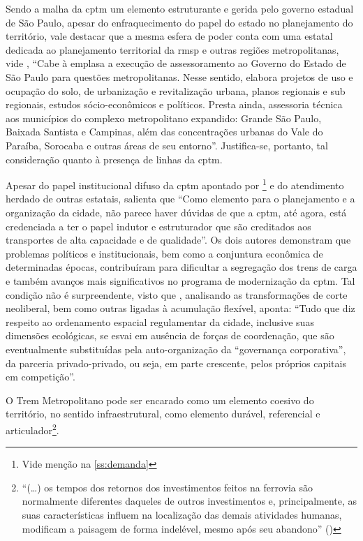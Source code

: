 \documentclass[11pt,fleqn]{book} %
\begin{document}
Sendo a malha da \gls{cptm} um elemento estruturante e gerida pelo governo estadual de São Paulo, apesar do enfraquecimento do papel do estado no planejamento do território, vale destacar que a mesma esfera de poder conta com uma estatal dedicada ao planejamento territorial da \gls{rmsp} e outras regiões metropolitanas, vide \cite[p. 224]{Stefani}, ``Cabe à \gls{emplasa} a execução de assessoramento ao Governo do Estado de São Paulo para questões metropolitanas. Nesse sentido, elabora projetos de uso e ocupação do solo, de urbanização e revitalização urbana, planos regionais e sub regionais, estudos sócio-econômicos e políticos. Presta ainda, assessoria técnica aos municípios do complexo metropolitano expandido: Grande São Paulo, Baixada Santista e Campinas, além das concentrações urbanas do Vale do Paraíba, Sorocaba e outras áreas de seu entorno''. Justifica-se, portanto, tal consideração quanto à presença de linhas da \gls{cptm}.

Apesar do papel institucional difuso da \gls{cptm} apontado por \cite{Isoda}\footnote{Vide menção na \autoref{ss:demanda}} e do atendimento herdado de outras estatais, \cite[p. 97]{Ferreira} salienta que ``Como elemento para o planejamento e a organização da cidade, não parece haver dúvidas de que a \gls{cptm}, até agora, está credenciada a ter o papel indutor e estruturador que são creditados aos transportes de alta capacidade e de qualidade''. Os dois autores demonstram que problemas políticos e institucionais, bem como a conjuntura econômica de determinadas épocas, contribuíram para dificultar a segregação dos trens de carga e também avanços mais significativos no programa de modernização da \gls{cptm}. Tal condição não é surpreendente, visto que \cite[p. 31]{Acselrad}, analisando as transformações de corte neoliberal, bem como outras ligadas à acumulação flexível, aponta: ``Tudo que diz respeito ao ordenamento	espacial regulamentar da cidade, inclusive suas dimensões ecológicas, se esvai em ausência	de forças de coordenação, que são eventualmente substituídas pela auto-organização da “governança corporativa”, da parceria privado-privado, ou seja, em parte crescente, pelos próprios capitais em competição''.

O Trem Metropolitano pode ser encarado como um elemento coesivo do território, no sentido infraestrutural, como elemento durável, referencial e articulador\footnote{``(\dots) os tempos dos retornos dos investimentos feitos na ferrovia são normalmente diferentes daqueles de outros investimentos e, principalmente, as suas características influem na localização das demais atividades humanas, modificam a paisagem de forma indelével, mesmo após seu abandono'' (\cite[p. 13]{Ferreira})}.
\end{document}
